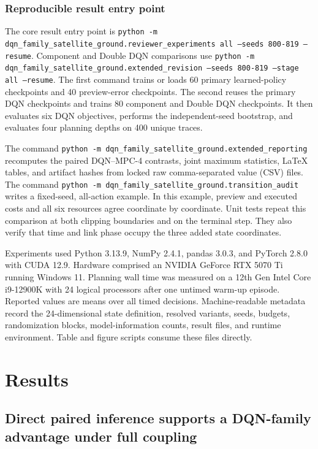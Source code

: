 \documentclass[remotesensing,article,submit,moreauthors]{Definitions/mdpi}
\begin{document}
\subsubsection{Reproducible result entry point}

The core result entry point is \texttt{python -m dqn\_family\_satellite\_ground.\allowbreak reviewer\_experiments all \allowbreak --seeds 800-819 \allowbreak --resume}. Component and Double DQN comparisons use \texttt{python -m dqn\_family\_satellite\_ground.\allowbreak extended\_revision \allowbreak --seeds 800-819 \allowbreak --stage all \allowbreak --resume}. The first command trains or loads 60 primary learned-policy checkpoints and 40 preview-error checkpoints. The second reuses the primary DQN checkpoints and trains 80 component and Double DQN checkpoints. It then evaluates six DQN objectives, performs the independent-seed bootstrap, and evaluates four planning depths on 400 unique traces.

The command \texttt{python -m dqn\_family\_satellite\_ground.\allowbreak extended\_reporting} recomputes the \DQNvsMPCContrastCount{} paired DQN--MPC-4 contrasts, joint maximum statistics, LaTeX tables, and artifact hashes from locked raw comma-separated value (CSV) files. The command \texttt{python -m dqn\_family\_satellite\_ground.\allowbreak transition\_audit} writes a fixed-seed, all-action example. In this example, preview and executed costs and all six resources agree coordinate by coordinate. Unit tests repeat this comparison at both clipping boundaries and on the terminal step. They also verify that time and link phase occupy the three added state coordinates.

Experiments used Python 3.13.9, NumPy 2.4.1, pandas 3.0.3, and PyTorch 2.8.0 with CUDA 12.9. Hardware comprised an NVIDIA GeForce RTX 5070 Ti running Windows 11. Planning wall time was measured on a 12th Gen Intel Core i9-12900K with 24 logical processors after one untimed warm-up episode. Reported values are means over all timed decisions. Machine-readable metadata record the 24-dimensional state definition, resolved variants, seeds, budgets, randomization blocks, model-information counts, result files, and runtime environment. Table and figure scripts consume these files directly.

\section{Results}
\label{sec:results}

\subsection{Direct paired inference supports a DQN-family advantage under full coupling}
\end{document}
